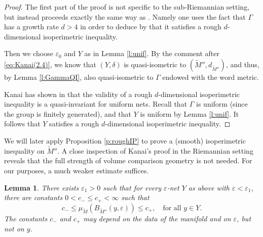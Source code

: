 \documentclass[10pt,letterpaper]{amsart}
\newtheorem{lemma}[thm]{Lemma}
\theoremstyle{definition}
\numberwithin{thm}{subsection}
\numberwithin{equation}{section}
\begin{document}
\begin{proof}
The first part of the proof is not specific to the sub-Riemannian setting, but instead proceeds exactly the same way as \cite[Proof of Theorem 1.3]{MR2832708}. Namely one uses the fact that $\Gamma$ has a growth rate $d>4$ in order to deduce by \cite[Th\'{e}or\`{e}me 1]{MR1232845} that it satisfies a rough $d$-dimensional isoperimetric inequality.

Then we choose $\varepsilon_0$ and $Y$ as in Lemma \ref{l:unif}. By the comment after \eqref{eq:Kanai(2.4)}, we know that $(Y,\delta)$ is quasi-isometric to $(\widetilde{M}'',d_{\widetilde{M}''})$, and thus, by Lemma \ref{l:GammaQI}, also quasi-isometric to $\Gamma$ endowed with the word metric.

Kanai has shown in \cite[Lemma 4.2]{MR792983} that the validity of a rough $d$-dimensional isoperimetric inequality is a quasi-invariant for uniform nets. Recall that $\Gamma$ is uniform (since the group is finitely generated), and that $Y$ is uniform by Lemma \ref{l:unif}. It follows that $Y$ satisfies a rough $d$-dimensional isoperimetric inequality.
\end{proof}

We will later apply Proposition \ref{p:roughIP} to prove a (smooth) isoperimetric inequality on $\widetilde{M}''$.
A close inspection of Kanai's proof in the Riemannian setting reveals that the full strength of volume comparison geometry is not needed. For our purposes, a much weaker estimate suffices.

\begin{lemma}\label{eq:volume_comparison}
There exists $\varepsilon_1>0$ such that for every $\varepsilon$-net $Y$ as above with $\varepsilon<\varepsilon_1$,
there are constants $0<c_- \leq c_+ <\infty$ such that
\begin{displaymath}
c_- \leq \mu_{\widetilde{M}}(B_{\widetilde{M}''}(y,\varepsilon))\leq  c_+,\quad \text{for all }y\in Y.
\end{displaymath}
The constants $c_-$ and $c_+$ may depend on the data of the manifold and on $\varepsilon$, but not on $y$.
\end{lemma}
\end{document}
